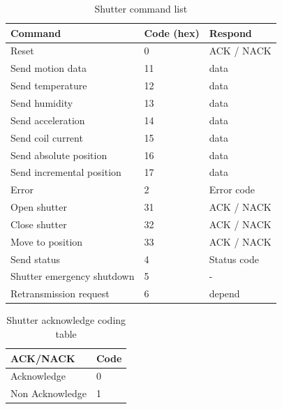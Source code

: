 	\begin{table}[H]
\begin{center}
    \begin{tabular}{| l || l  || l  |}
    \hline
    \bf{Command}				& \bf{Code (hex)} & \bf{Respond}\\ \hline
	Reset						& 0  		 	  & ACK / NACK	\\ \hline
	Send motion data			& 11  		 	  & data 		\\ \hline
	Send temperature			& 12  		 	  & data		\\ \hline
	Send humidity				& 13  		 	  & data		\\ \hline
	Send acceleration			& 14  		 	  & data		\\ \hline
	Send coil current			& 15  		 	  & data		\\ \hline
	Send absolute position		& 16  		 	  & data		\\ \hline
	Send incremental position	& 17  		 	  & data		\\ \hline
	Error						& 2  		 	  & Error code	\\ \hline
	Open shutter				& 31  		 	  & ACK / NACK	\\ \hline
	Close shutter				& 32  		 	  & ACK / NACK	\\ \hline
	Move to position			& 33  		 	  & ACK / NACK	\\ \hline
	Send status					& 4  		 	  & Status code	\\ \hline
	Shutter emergency shutdown 	& 5  		 	  & -			\\ \hline
	Retransmission request 		& 6  		 	  & depend		\\ \hline
    \end{tabular}
    \end{center}
    \caption{Shutter command list}
	\label{table:shut_err_table}
\end{table}

	\begin{table}[H]
\begin{center}
    \begin{tabular}{ | l || l  |}
    \hline
    \bf{ACK/NACK}		& \bf{Code} 	\\ \hline
	Acknowledge			& 0 	\\ \hline
	Non Acknowledge 	& 1 	\\ \hline
    \end{tabular}
    \end{center}
    \caption{Shutter acknowledge coding table}
	\label{table:shut_err_table}
\end{table}
	

